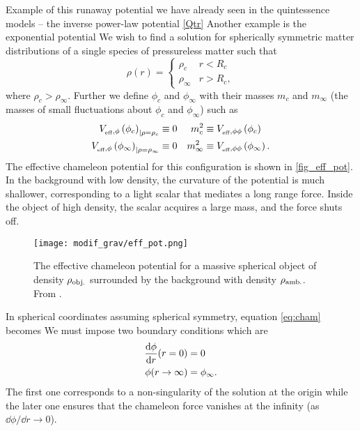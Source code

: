 Example of this runaway potential we have already seen in the quintessence models -- the inverse power-law potential \eqref{Qtr}
Another example is the exponential potential
We wish to find a solution for spherically symmetric matter distributions of a single species of pressureless matter such that
\begin{equation*}
\rho(r)=
\begin{cases}
\rho_c & r<R_c \\
\rho_\infty & r>R_c,
\end{cases}
\end{equation*}
where $\rho_c>\rho_\infty$. Further we define $\phi_c$ and $\phi_\infty$ with their masses $m_c$ and $m_\infty$ (the masses of small fluctuations about $\phi_c$ and $\phi_\infty$) such as
\begin{align*}
V_{_\text{\tiny eff},\phi}\left(\phi_c\right)_{|\rho=\rho_c}&\equiv0	&	m^2_c&\equiv V_{_\text{\tiny eff},\phi\phi}\left(\phi_c\right) \\
V_{_\text{\tiny eff},\phi}\left(\phi_\infty\right)_{|\rho=\rho_\infty}&\equiv0	&	m^2_{\infty}&\equiv V_{_\text{\tiny eff},\phi\phi}\left(\phi_\infty\right).
\end{align*}
The effective chameleon potential for this configuration is shown in \autoref{fig_eff_pot}. In the background with low density, the curvature of the potential is much shallower, corresponding to a light scalar that mediates a long range force. Inside the object of high density, the scalar acquires a large mass, and the force shuts off.
\begin{figure}
	\centering
		\texttt{[image: modif\_grav/eff\_pot.png]}
	\caption{The effective chameleon potential for a massive spherical object of density $\rho_{\mbox{\scriptsize{obj.}}}$ surrounded by the background with density $\rho_{\mbox{\scriptsize{amb.}}}$. From \textcite{2015PhR...568....1J}.}
	\label{fig_eff_pot}
\end{figure}

In spherical coordinates assuming spherical symmetry, equation \eqref{eq:cham} becomes
We must impose two boundary conditions which are
\begin{align*}
\frac{\mbox{d} \phi}{\mbox{d} r}(r=0)&=0 \\
\phi(r\rightarrow\infty)&=\phi_\infty.
\end{align*}
The first one corresponds to a non-singularity of the solution at the origin while the later one ensures that the chameleon force vanishes at the infinity (as $\dd\phi/\dd r\rightarrow0$).

